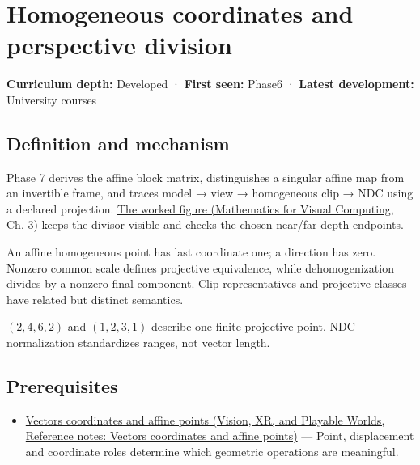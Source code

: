 \hypertarget{appendix-cb3b26862282}{}\label{referencestart:appendix-cb3b26862282}
\section{Homogeneous coordinates and perspective division}\label{appendix-cb3b26862282-homogeneous-coordinates-and-perspective-division}

\textbf{Curriculum depth:} Developed · \textbf{First seen:} Phase6 · \textbf{Latest development:} University courses

\begin{allmightroledefinition}

\subsection{Definition and mechanism}\label{appendix-cb3b26862282-definition-and-mechanism}

Phase 7 derives the affine block matrix, distinguishes a singular affine map from an invertible frame, and traces model → view → homogeneous clip → NDC using a declared projection. \href{../02-Mathematics-for-Visual-Computing/main.pdf\#nameddest=01-foundations-i-ch019-figure-m6---follow-one-point-through-named-spaces}{The worked figure (Mathematics for Visual Computing, Ch. 3)} keeps the divisor visible and checks the chosen near/far depth endpoints.

\end{allmightroledefinition}

An affine homogeneous point has last coordinate one; a direction has zero. Nonzero common scale defines projective equivalence, while dehomogenization divides by a nonzero final component. Clip representatives and projective classes have related but distinct semantics.

\((2,4,6,2)\) and \((1,2,3,1)\) describe one finite projective point. NDC normalization standardizes ranges, not vector length.

\subsection{Prerequisites}\label{appendix-cb3b26862282-prerequisites}

\begin{itemize}
\tightlist
\item
  \href{../07-Vision-XR-and-Playable-Worlds/main.pdf\#nameddest=appendix-0659864c0aa3}{Vectors coordinates and affine points (Vision, XR, and Playable Worlds, Reference notes: Vectors coordinates and affine points)} --- Point, displacement and coordinate roles determine which geometric operations are meaningful.
\end{itemize}

